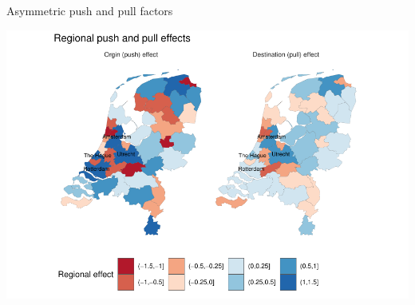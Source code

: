 \documentclass{beamer}
\begin{document}
\begin{frame}{Asymmetric push and pull factors}
	\begin{center}
	\includegraphics[width=1\textwidth]{../../fig/regional_effects}
\end{center}
\end{frame}


\end{document}

